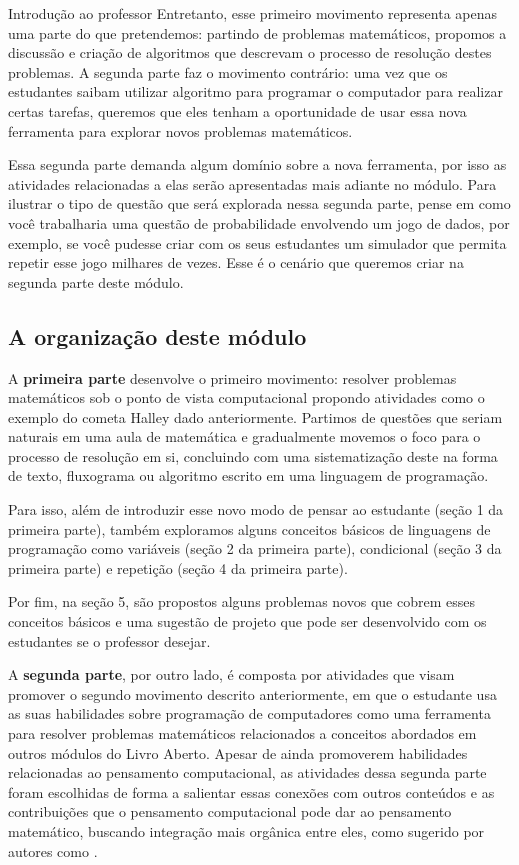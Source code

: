 \begin{apresentacao}{Introdução ao professor}
Entretanto, esse primeiro movimento representa apenas uma parte do que pretendemos: partindo de problemas matemáticos, propomos a discussão e criação de algoritmos que descrevam o processo de resolução destes problemas. A segunda parte faz o movimento contrário: uma vez que os estudantes saibam utilizar algoritmo para programar o computador para realizar certas tarefas, queremos que eles tenham a oportunidade de usar essa nova ferramenta para explorar novos problemas matemáticos.

Essa segunda parte demanda algum domínio sobre a nova ferramenta, por isso as atividades relacionadas a elas serão apresentadas mais adiante no módulo. Para ilustrar o tipo de questão que será explorada nessa segunda parte, pense em como você trabalharia uma questão de probabilidade envolvendo um jogo de dados, por exemplo, se você pudesse criar com os seus estudantes um simulador que permita repetir esse jogo milhares de vezes. Esse é o cenário que queremos criar na segunda parte deste módulo.

\subsection{A organização deste módulo}

A \textbf{primeira parte} desenvolve o primeiro movimento: resolver problemas matemáticos sob o ponto de vista computacional propondo atividades como o exemplo do cometa Halley dado anteriormente. Partimos de questões que seriam naturais em uma aula de matemática e gradualmente movemos o foco para o processo de resolução em si, concluindo com uma sistematização deste na forma de texto, fluxograma ou algoritmo escrito em uma linguagem de programação.

Para isso, além de introduzir esse novo modo de pensar ao estudante (seção 1 da primeira parte), também exploramos alguns conceitos básicos de linguagens de programação como variáveis (seção 2 da primeira parte), condicional (seção 3 da primeira parte) e repetição (seção 4 da primeira parte).

Por fim, na seção 5, são propostos alguns problemas novos que cobrem esses conceitos básicos e uma sugestão de projeto que pode ser desenvolvido com os estudantes se o professor desejar.

A \textbf{segunda parte}, por outro lado, é composta por atividades que visam promover o segundo movimento descrito anteriormente, em que o estudante usa as suas habilidades sobre programação de computadores como uma ferramenta para resolver problemas matemáticos relacionados a conceitos abordados em outros módulos do Livro Aberto. Apesar de ainda promoverem habilidades relacionadas ao pensamento computacional, as atividades dessa segunda parte foram escolhidas de forma a salientar essas conexões com outros conteúdos e as contribuições que o pensamento computacional pode dar ao pensamento matemático, buscando integração mais orgânica entre eles, como sugerido por autores como \citet{disessa2018}.


\end{apresentacao}
